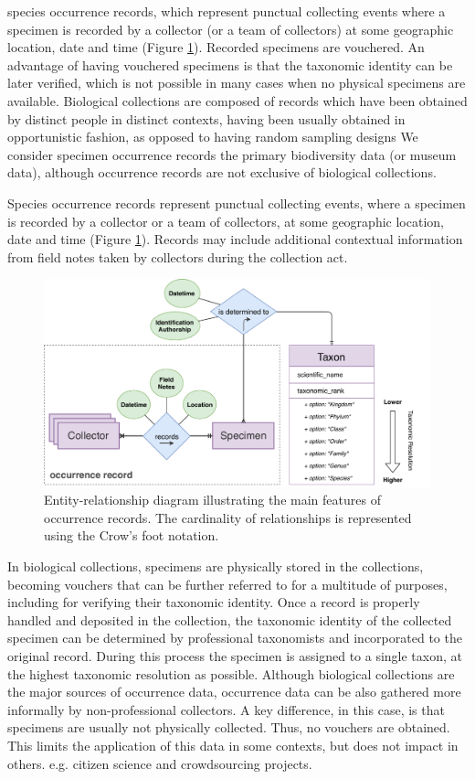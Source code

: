 species occurrence records, which represent punctual collecting events where a specimen is recorded by a collector (or a team of collectors) at some geographic location, date and time (Figure \ref{fig:occurrences_er}).
Recorded specimens are vouchered.
An advantage of having vouchered specimens is that the taxonomic identity can be later verified, which is not possible in many cases when no physical specimens are available.
Biological collections are composed of records which have been obtained by distinct people in distinct contexts, having been usually obtained in opportunistic fashion, as opposed to having random sampling designs %
We consider specimen occurrence records the primary biodiversity data (or museum data), although occurrence records are not exclusive of biological collections.

Species occurrence records represent punctual collecting events, where a specimen is recorded by a collector or a team of collectors, at some geographic location, date and time (Figure \ref{fig:occurrences_er}).
Records may include additional contextual information from field notes taken by collectors during the collection act.
\begin{figure}[h!]
  	\centering
    \includegraphics[width=\linewidth]{figures/collections_data/occurrences_er.pdf}
    \caption{Entity-relationship diagram illustrating the main features of occurrence records. The cardinality of relationships is represented using the Crow's foot notation.}
    \label{fig:occurrences_er}
\end{figure}

In biological collections, specimens are physically stored in the collections, becoming vouchers that can be further referred to for a multitude of purposes, including for verifying their taxonomic identity.
Once a record is properly handled and deposited in the collection, the taxonomic identity of the collected specimen can be determined by professional taxonomists and incorporated to the original record. 
During this process the specimen is assigned to a single taxon, at the highest taxonomic resolution as possible.
Although biological collections are the major sources of occurrence data, occurrence data can be also gathered more informally by non-professional collectors.
A key difference, in this case, is that specimens are usually not physically collected. Thus, no vouchers are obtained.
This limits the application of this data in some contexts, but does not impact in others.
 e.g. citizen science and crowdsourcing projects.



